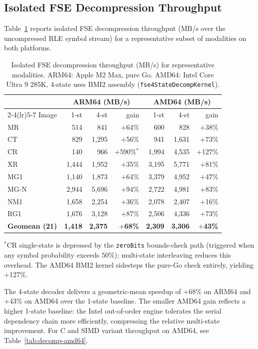 \documentclass[journal]{IEEEtran}
\begin{document}
\subsection{Isolated FSE Decompression Throughput}

Table~\ref{tab:fse-combined} reports isolated FSE decompression throughput
(MB/s over the uncompressed RLE symbol stream) for a representative subset of
modalities on both platforms.

\begin{table}[htbp]
\centering
\caption{Isolated FSE decompression throughput (MB/s) for representative
modalities. ARM64: Apple M2 Max, pure Go. AMD64: Intel Core Ultra 9 285K,
4-state uses BMI2 assembly (\texttt{fse4StateDecompKernel}).}
\label{tab:fse-combined}
\scriptsize
\begin{tabular}{lrrrrrr}
\toprule
 & \multicolumn{3}{c}{ARM64 (MB/s)} & \multicolumn{3}{c}{AMD64 (MB/s)} \\
\cmidrule(lr){2-4}\cmidrule(lr){5-7}
Image & 1-st & 4-st & gain & 1-st & 4-st & gain \\
\midrule
MR   &   514 &   841 & $+$64\% &   600 &   828 & $+$38\% \\
CT   &   829 & 1,295 & $+$56\% &   941 & 1,631 & $+$73\% \\
CR   &   140 &   966 & $+$590\%$^*$ & 1,994 & 4,535 & $+$127\% \\
XR   & 1,444 & 1,952 & $+$35\% & 3,195 & 5,771 & $+$81\% \\
MG1  & 1,140 & 1,873 & $+$64\% & 3,379 & 4,952 & $+$47\% \\
MG-N & 2,944 & 5,696 & $+$94\% & 2,722 & 4,981 & $+$83\% \\
NM1  & 1,658 & 2,254 & $+$36\% & 2,078 & 2,407 & $+$16\% \\
RG1  & 1,676 & 3,128 & $+$87\% & 2,506 & 4,336 & $+$73\% \\
\midrule
\textbf{Geomean (21)} & \textbf{1,418} & \textbf{2,375} & \textbf{$+$68\%} &
\textbf{2,309} & \textbf{3,306} & \textbf{$+$43\%} \\
\bottomrule
\end{tabular}
\end{table}

$^*$CR single-state is depressed by the \texttt{zeroBits} bounds-check path
(triggered when any symbol probability exceeds 50\%); multi-state interleaving
reduces this overhead. The AMD64 BMI2 kernel sidesteps the pure-Go check
entirely, yielding $+$127\%.

The 4-state decoder delivers a geometric-mean speedup of $+$68\% on ARM64 and
$+$43\% on AMD64 over the 1-state baseline. The smaller AMD64 gain reflects
a higher 1-state baseline: the Intel out-of-order engine tolerates the serial
dependency chain more efficiently, compressing the relative multi-state
improvement. For C and SIMD variant throughput on AMD64, see
Table~\ref{tab:decomp-amd64}.
\end{document}
